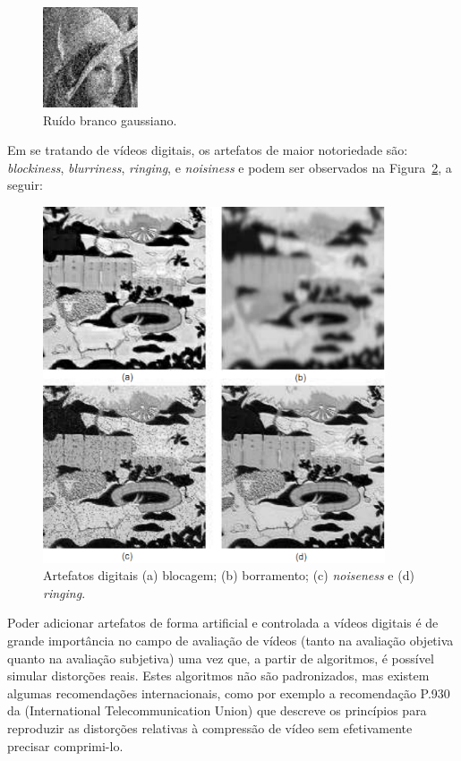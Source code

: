 \begin{figure}[!htb]
	\centering
	\includegraphics[width=0.25\textwidth]{./imgs/artefatosanalogicos.png}
	\caption{Ruído branco gaussiano.}
	\label{fig:artefatosanalogicos}
\end{figure}

Em se tratando de vídeos digitais, os artefatos de maior notoriedade são: \emph{blockiness}, \emph{blurriness}, \emph{ringing}, e \emph{noisiness} \cite{farias2007} e podem ser observados na Figura~\ref{fig:artefatosdigitais}, a seguir:

\begin{figure}[!htb]
	\centering
	\includegraphics[width=0.9\textwidth]{./imgs/artefatosdigitais.png}
	\caption[Artefatos digitais]{Artefatos digitais (a) blocagem; (b) borramento; (c) \emph{noiseness} e (d) \emph{ringing}.}
	\label{fig:artefatosdigitais}
\end{figure}

Poder adicionar artefatos de forma artificial e controlada a vídeos digitais é de grande importância no campo de avaliação de vídeos (tanto na avaliação objetiva quanto na avaliação subjetiva) uma vez que, a partir de algoritmos, é possível simular distorções reais. Estes algoritmos não são padronizados, mas existem algumas recomendações internacionais, como por exemplo a recomendação P.930 da  (International Telecommunication Union)\cite{itup930} que descreve os princípios para reproduzir as distorções relativas à compressão de vídeo sem efetivamente precisar comprimi-lo.

